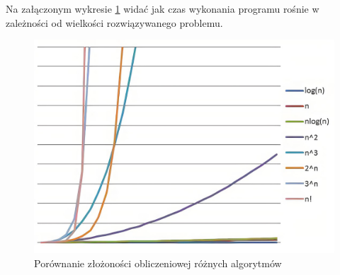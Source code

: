 Na załączonym wykresie \ref{fig:wykres} widać jak czas wykonania programu rośnie w zależności od wielkości rozwiązywanego problemu.
\begin{figure}[htbp]
    \centering
    \includegraphics[scale=0.21]{pictures/zlozonosc_obliczeniowa.jpeg}
    \caption{Porównanie złożoności obliczeniowej różnych algorytmów}
    \label{fig:wykres}
\end{figure} 
